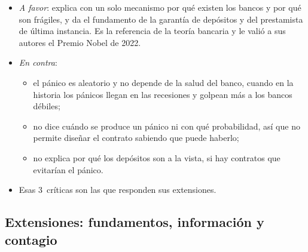 \documentclass[11pt]{article}
\begin{document}
\begin{itemize}
\item \emph{A favor}: explica con un solo mecanismo por qué existen los bancos y por qué son frágiles, y da el fundamento de la garantía de depósitos y del prestamista de última instancia. Es la referencia de la teoría bancaria y le valió a sus autores el Premio Nobel de 2022\nocite{Nobel2022Bancos}.
\item \emph{En contra}:
  \begin{itemize}
  \item el pánico es aleatorio y no depende de la salud del banco, cuando en la historia los pánicos llegan en las recesiones y golpean más a los bancos débiles;
  \item no dice cuándo se produce un pánico ni con qué probabilidad, así que no permite diseñar el contrato sabiendo que puede haberlo;
  \item no explica por qué los depósitos son a la vista, si hay contratos que evitarían el pánico.
  \end{itemize}
\item Esas 3~críticas son las que responden sus extensiones.
\end{itemize}

\subsection{Extensiones: fundamentos, información y contagio}\label{sec:extensiones}
\end{document}
